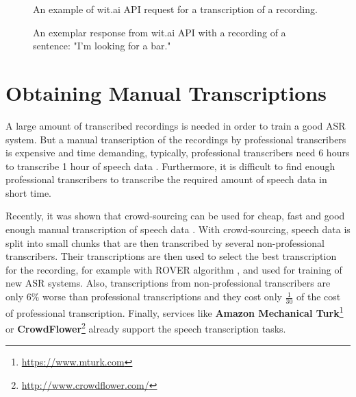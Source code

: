 \begin{figure}[h]
  

  \caption{An example of wit.ai API request for a transcription of a recording.}
  \label{fig:wit-ai-request}
\end{figure}

\begin{figure}[h]
  

  \caption{An exemplar response from wit.ai API with a recording of a sentence: "I'm looking for a bar."}
  \label{fig:wit-ai-response}
\end{figure}


\section{Obtaining Manual Transcriptions}
A large amount of transcribed recordings is needed in order to train a good ASR system.
But a manual transcription of the recordings by professional transcribers is expensive and time demanding,
  typically, professional transcribers need 6 hours to transcribe 1 hour of speech data \cite{williams2011crowd}.
Furthermore, it is difficult to find enough professional transcribers to transcribe the required amount of speech data in short time.

Recently, it was shown that crowd-sourcing can be used for cheap, fast and good enough manual transcription of speech data \cite{novotney2010cheap}.
With crowd-sourcing, speech data is split into small chunks that are then transcribed by several non-professional transcribers.
Their transcriptions are then used to select the best transcription for the recording, for example with ROVER algorithm \cite{marge2010using}, and used for training of new ASR systems.
Also, transcriptions from non-professional transcribers are only $6\%$ worse than professional transcriptions
  and they cost only $\frac{1}{30}$ of the cost of professional transcription.
Finally, services like \textbf{Amazon Mechanical Turk}\footnote{\url{https://www.mturk.com}}
  or \textbf{CrowdFlower}\footnote{\url{http://www.crowdflower.com/}} already support the speech transcription tasks.
